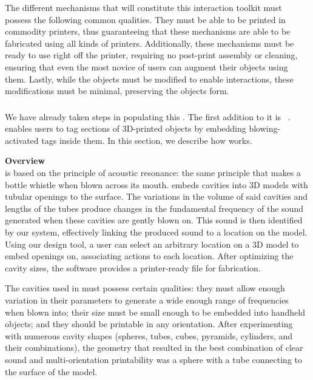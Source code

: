     The different mechanisms that will constitute this interaction toolkit must
    possess the following common qualities. They must be able to be printed in
    commodity printers, thus guaranteeing that these mechanisms are able to be
    fabricated using all kinds of printers. Additionally, these mechanisms must
    be ready to use right off the printer, requiring no post-print assembly or
    cleaning, ensuring that even the most novice of users can augment their
    objects using them. Lastly, while the objects must be modified to enable
    interactions, these modifications must be minimal, preserving the objects
    form.

    \subsubsection{\bh}
      We have already taken steps in populating this \itoolkit. The first
      addition to it is \bh~\cite{Tejada:2018fj}. \bh enables users to tag
      sections of 3D-printed objects by embedding blowing-activated tags inside
      them. In this section, we describe how \bh works.

      \textbf{Overview}\\
        \bh is based on the principle of acoustic resonance: the same principle
        that makes a bottle whistle when blown across its mouth.  \bh embeds
        cavities into 3D models with tubular openings to the surface. The
        variations in the volume of said cavities and lengths of the tubes
        produce changes in the fundamental frequency of the sound generated
        when these cavities are gently blown on. This sound is then identified
        by our system, effectively linking the produced sound to a location on
        the model. Using our design tool, a user can select an arbitrary
        location on a 3D model to embed openings on, associating actions to
        each location. After optimizing the cavity sizes, the software provides
        a printer-ready file for fabrication.

        The cavities used in \bh must possess certain qualities: they must
        allow enough variation in their parameters to generate a wide enough
        range of frequencies when blown into; their size must be small enough
        to be embedded into handheld objects; and they should be printable in
        any orientation. After experimenting with numerous cavity shapes
        (spheres, tubes, cubes, pyramids, cylinders, and their combinations),
        the geometry that resulted in the best combination of clear sound and
        multi-orientation printability was a sphere with a tube connecting to
        the surface of the model.

